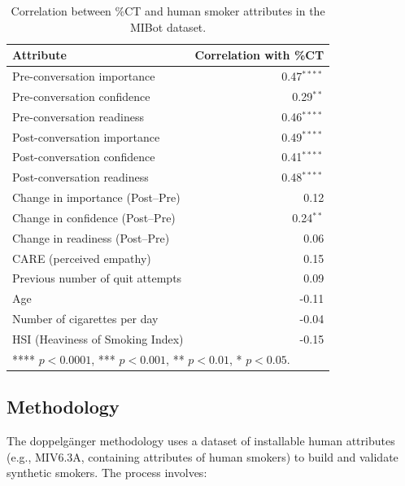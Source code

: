 \begin{table}[!ht]
	\centering
	\begin{tabular}{@{}lr@{}}
		\toprule
		\textbf{Attribute}               & \textbf{Correlation with \%CT} \\
		\midrule
		Pre-conversation importance      & 0.47$^{****}$                  \\
		Pre-conversation confidence      & 0.29$^{**}$                    \\
		Pre-conversation readiness       & 0.46$^{****}$                  \\
		\midrule
		Post-conversation importance     & 0.49$^{****}$                  \\
		Post-conversation confidence     & 0.41$^{****}$                  \\
		Post-conversation readiness      & 0.48$^{****}$                  \\
		\midrule
		Change in importance (Post--Pre) & 0.12                           \\
		Change in confidence (Post--Pre) & 0.24$^{**}$                    \\
		Change in readiness (Post--Pre)  & 0.06                           \\
		\midrule
		CARE (perceived empathy)         & 0.15                           \\
		Previous number of quit attempts & 0.09                           \\
		Age                              & -0.11                          \\
		Number of cigarettes per day     & -0.04                          \\
		HSI (Heaviness of Smoking Index) & -0.15                          \\
		\bottomrule
		\multicolumn{2}{l}{\footnotesize{**** $p < 0.0001$, *** $p < 0.001$, ** $p < 0.01$, * $p < 0.05$}.}
	\end{tabular}
	\caption{Correlation between \%CT and human smoker attributes in the MIBot dataset.}
	\label{tab:ct-correlation}
\end{table}

\subsection{Methodology}
The doppelgänger methodology uses a dataset of installable human attributes (e.g.,
MIV6.3A, containing attributes of human smokers) to build and validate synthetic
smokers. The process involves:


